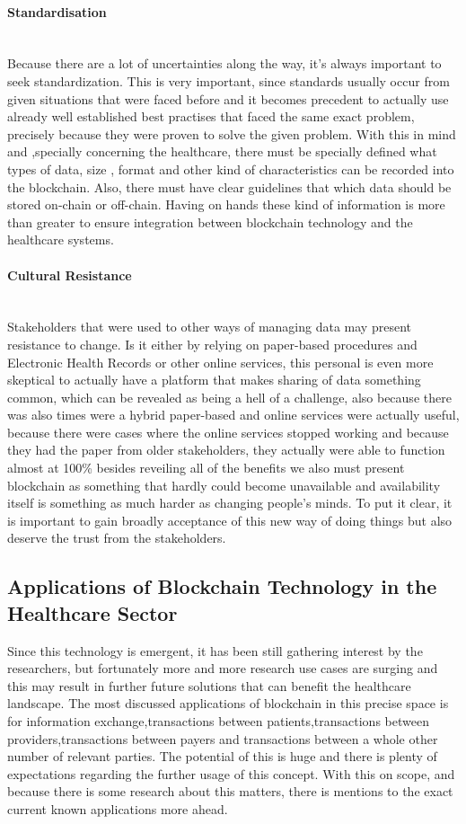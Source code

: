 \paragraph{Standardisation} \mbox{}\\
Because there are a lot of uncertainties along the way, it's always important to seek standardization. This is very important, since standards usually occur from given situations that were faced before and it becomes precedent to actually use already well established best practises that faced the same exact problem, precisely because they were proven to solve the given problem. With this in mind and ,specially concerning the healthcare, there must be specially defined what types of data, size , format and other kind of characteristics can be recorded into the blockchain. Also, there must have clear guidelines that which data should be stored on-chain or off-chain. Having on hands these kind of information is more than greater to ensure integration between blockchain technology and the healthcare systems.

\paragraph{Cultural Resistance} \mbox{}\\
Stakeholders that were used to other ways of managing data may present resistance to change. Is it either by relying on paper-based procedures and Electronic Health Records or other online services, this personal is even more skeptical to actually have a platform that makes sharing of data something common, which can be revealed as being a hell of a challenge, also because there was also times were a hybrid paper-based and online services were actually useful, because there were cases where the online services stopped working and because they had the paper from older stakeholders, they actually were able to function almost at 100\% besides reveiling all of the benefits we also must present blockchain as something that hardly could become unavailable and availability itself is something as much harder as changing people's minds. To put it clear, it is important to gain broadly acceptance of this new way of doing things but also deserve the trust from the stakeholders.

\subsection{Applications of Blockchain Technology in the Healthcare Sector}
Since this technology is emergent, it has been still gathering interest by the researchers, but fortunately more and more research use cases are surging and this may result in further future solutions that can benefit the healthcare landscape. The most discussed applications of blockchain in this precise space is for information exchange,transactions between patients,transactions between providers,transactions between payers and transactions between a whole other number of relevant parties. The potential of this is huge and there is plenty of expectations regarding the further usage of this concept.
With this on scope, and because there is some research about this matters, there is mentions to the exact current known applications more ahead.


